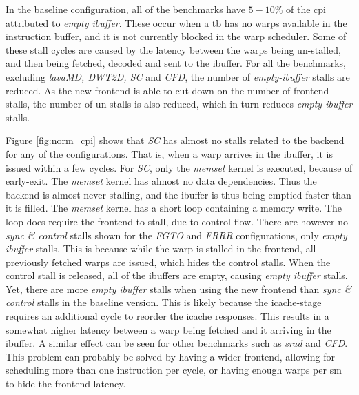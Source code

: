 In the baseline configuration, all of the benchmarks have $5-10\%$ of the \acrshort{cpi} attributed to \textit{empty ibuffer}. These occur when a \acrshort{tb} has no warps available in the instruction buffer, and it is not currently blocked in the warp scheduler. Some of these stall cycles are caused by the latency between the warps being un-stalled, and then being fetched, decoded and sent to the ibuffer. For all the benchmarks, excluding \textit{lavaMD, DWT2D, SC} and \textit{CFD}, the number of \textit{empty-ibuffer} stalls are reduced. As the new frontend is able to cut down on the number of frontend stalls, the number of un-stalls is also reduced, which in turn reduces \textit{empty ibuffer} stalls.

Figure \ref{fig:norm_cpi} shows that \textit{SC} has almost no stalls related to the backend for any of the configurations. That is, when a warp arrives in the ibuffer, it is issued within a few cycles. For \textit{SC}, only the \textit{memset} kernel is executed, because of early-exit. The \textit{memset} kernel has almost no data dependencies. Thus the backend is almost never stalling, and the ibuffer is thus being emptied faster than it is filled. The \textit{memset} kernel has a short loop containing a memory write. The loop does require the frontend to stall, due to control flow. There are however no \textit{sync \& control} stalls shown for the \textit{FGTO} and \textit{FRRR} configurations, only \textit{empty ibuffer} stalls. This is because while the warp is stalled in the frontend, all previously fetched warps are issued, which hides the control stalls. When the control stall is released, all of the ibuffers are empty, causing \textit{empty ibuffer} stalls. Yet, there are more \textit{empty ibuffer} stalls when using the new frontend than \textit{sync \& control} stalls in the baseline version. This is likely because the icache-stage requires an additional cycle to reorder the icache responses. This results in a somewhat higher latency between a warp being fetched and it arriving in the ibuffer. A similar effect can be seen for other benchmarks such as \textit{srad} and \textit{CFD}. This problem can probably be solved by having a wider frontend, allowing for scheduling more than one instruction per cycle, or having enough warps per \acrshort{sm} to hide the frontend latency.


